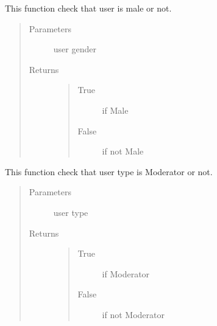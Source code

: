 \documentclass[letterpaper,10pt,english]{sphinxmanual}
\begin{document}

\begin{fulllineitems}
\label{\detokenize{janta:janta.viewhelper.is_male}}
This function check that user  is male or not.
\begin{quote}\begin{description}
\item[{Parameters}] \leavevmode
{} \textendash{} user gender

\item[{Returns}] \leavevmode
\begin{quote}\begin{description}
\item[{True}] \leavevmode
if Male

\item[{False}] \leavevmode
if not Male

\end{description}\end{quote}


\end{description}\end{quote}

\end{fulllineitems}


\begin{fulllineitems}
\label{\detokenize{janta:janta.viewhelper.is_moderator}}
This function check that user type is Moderator or not.
\begin{quote}\begin{description}
\item[{Parameters}] \leavevmode
{} \textendash{} user type

\item[{Returns}] \leavevmode
\begin{quote}\begin{description}
\item[{True}] \leavevmode
if Moderator

\item[{False}] \leavevmode
if not Moderator

\end{description}\end{quote}


\end{description}\end{quote}

\end{fulllineitems}
\end{document}
